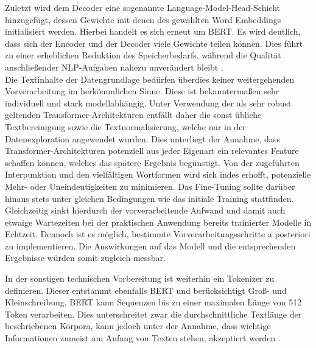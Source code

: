 \noindent
Zuletzt wird dem Decoder eine sogenannte Language-Model-Head-Schicht hinzugefügt, dessen Gewichte mit denen des gewählten Word Embeddings initialisiert werden. Hierbei handelt es sich erneut um \ac{BERT}. Es wird deutlich, dass sich der Encoder und der Decoder viele Gewichte teilen können. Dies führt zu einer erheblichen Reduktion des Speicherbedarfs, während die Qualität anschließender \ac{NLP}-Aufgaben nahezu unverändert bleibt \cite[S.~2]{ROT20}.\\

\noindent
Die Textinhalte der Datengrundlage bedürfen überdies keiner weitergehenden Vorverarbeitung im herkömmlichen Sinne. Diese ist bekanntermaßen sehr individuell und stark modellabhängig. Unter Verwendung der als sehr robust geltenden Transformer-Architekturen entfällt daher die sonst übliche Textbereinigung sowie die Textnormalisierung, welche nur in der Datenexploration angewendet wurden. Dies unterliegt der Annahme, dass Transformer-Architekturen potenziell aus jeder Eigenart ein relevantes Feature schaffen können, welches das spätere Ergebnis begünstigt. Von der zugeführten Interpunktion und den vielfältigen Wortformen wird sich indes erhofft, potenzielle Mehr- oder Uneindeutigkeiten zu minimieren. Das Fine-Tuning sollte darüber hinaus stets unter gleichen Bedingungen wie das initiale Training stattfinden. Gleichzeitig sinkt hierdurch der vorverarbeitende Aufwand und damit auch etwaige Wartezeiten bei der praktischen Anwendung bereits trainierter Modelle in Echtzeit. Dennoch ist es möglich, bestimmte Vorverarbeitungsschritte a posteriori zu implementieren. Die Auswirkungen auf das Modell und die entsprechenden Ergebnisse würden somit zugleich messbar.
\newpage

\noindent
In der sonstigen technischen Vorbereitung ist weiterhin ein Tokenizer zu definieren. Dieser entstammt ebenfalls \ac{BERT} und berücksichtigt Groß- und Kleinschreibung. \ac{BERT} kann Sequenzen bis zu einer maximalen Länge von 512 Token verarbeiten. Dies unterschreitet zwar die durchschnittliche Textlänge der beschriebenen Korpora, kann jedoch unter der Annahme, dass wichtige Informationen zumeist am Anfang von Texten stehen, akzeptiert werden \cite{VON20}.\\

